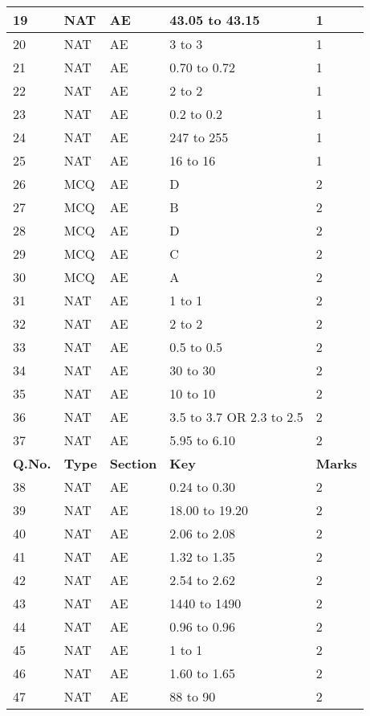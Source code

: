 \documentclass[12pt]{article}
\begin{document}
\begin{center}
\begin{longtable}{|p{2.5cm}|p{2.5cm}|p{2.5cm}|p{6cm}|p{2.5cm}|}
		\hline
		19 & NAT & AE & 43.05 to 43.15 & 1 \\
		\hline
		20 & NAT & AE & 3 to 3 & 1 \\
		\hline
		21 & NAT & AE & 0.70 to 0.72 & 1 \\
		\hline
		22 & NAT & AE & 2 to 2 & 1 \\
		\hline
		23 & NAT & AE & 0.2 to 0.2 & 1 \\
		\hline
		24 & NAT & AE & 247 to 255 & 1 \\
		\hline
		25 & NAT & AE & 16 to 16 & 1 \\
		\hline
		26 & MCQ & AE & D & 2 \\
		\hline
		27 & MCQ & AE & B & 2 \\
		\hline
		28 & MCQ & AE & D & 2 \\
		\hline
		29 & MCQ & AE & C & 2 \\
		\hline
		30 & MCQ & AE & A & 2 \\
		\hline
		31 & NAT & AE & 1 to 1 & 2 \\
		\hline
		32 & NAT & AE & 2 to 2 & 2 \\
		\hline
		33 & NAT & AE & 0.5 to 0.5 & 2 \\
		\hline
		34 & NAT & AE & 30 to 30 & 2 \\
		\hline
		35 & NAT & AE & 10 to 10 & 2 \\
		\hline
		36 & NAT & AE & 3.5 to 3.7 OR 2.3 to 2.5 & 2 \\
		\hline
		37 & NAT & AE & 5.95 to 6.10 & 2 \\
		\hline
		\newpage	
		\rowcolor{customgray}
		\textbf{Q.No.} & \textbf{Type} & \textbf{Section} & \textbf{Key} & \textbf{Marks} \\
		\hline
		38 & NAT & AE & 0.24 to 0.30 & 2 \\
		\hline
		39 & NAT & AE & 18.00 to 19.20 & 2 \\
		\hline
		40 & NAT & AE & 2.06 to 2.08 & 2 \\
		\hline
		41 & NAT & AE & 1.32 to 1.35 & 2 \\
		\hline
		42 & NAT & AE & 2.54 to 2.62 & 2 \\
		\hline
		43 & NAT & AE & 1440 to 1490 & 2 \\
		\hline
		44 & NAT & AE & 0.96 to 0.96 & 2 \\
		\hline
		45 & NAT & AE & 1 to 1 & 2 \\
		\hline
		46 & NAT & AE & 1.60 to 1.65 & 2 \\
		\hline
		47 & NAT & AE & 88 to 90 & 2 \\

\end{longtable}
\end{center}
\end{document}
